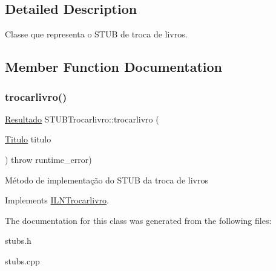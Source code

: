 \subsection{Detailed Description}
Classe que representa o S\+T\+UB de troca de livros. 

\subsection{Member Function Documentation}
\mbox{\label{classSTUBTrocarlivro_ab88f0806c4f92ecf3069c4b036f5b7ef}} 
\subsubsection{\texorpdfstring{trocarlivro()}{trocarlivro()}}
{\footnotesize\ttfamily \hyperlink{classResultado}{Resultado} S\+T\+U\+B\+Trocarlivro\+::trocarlivro (\begin{DoxyParamCaption}\item[{\hyperlink{classTitulo}{Titulo}}]{titulo }\end{DoxyParamCaption}) throw  runtime\+\_\+error) \hspace{0.3cm}{\ttfamily [virtual]}}

Método de implementação do S\+T\+UB da troca de livros 

Implements \hyperlink{classILNTrocarlivro}{I\+L\+N\+Trocarlivro}.



The documentation for this class was generated from the following files\+:\begin{DoxyCompactItemize}
\item 
stubs.\+h\item 
stubs.\+cpp\end{DoxyCompactItemize}
